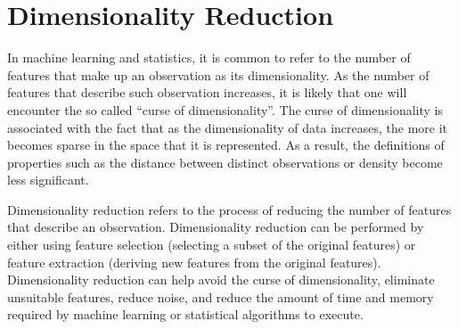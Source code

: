 \section{Dimensionality Reduction} \label{sect:meth:dim-reduction}
In machine learning and statistics, it is common to refer to the number of features that make up an observation as its dimensionality. As the number of features that describe such observation increases, it is likely that one will encounter the so called ``curse of dimensionality''. The curse of dimensionality is associated with the fact that as the dimensionality of data increases, the more it becomes sparse in the space that it is represented. As a result, the definitions of properties such as the distance between distinct observations or density become less significant. \newline

Dimensionality reduction refers to the process of reducing the number of features that describe an observation. Dimensionality reduction can be performed by either using feature selection (selecting a subset of the original features) or feature extraction (deriving new features from the original features). Dimensionality reduction can help avoid the curse of dimensionality, eliminate unsuitable features, reduce noise, and reduce the amount of time and memory required by machine learning or statistical algorithms to execute. \newline

